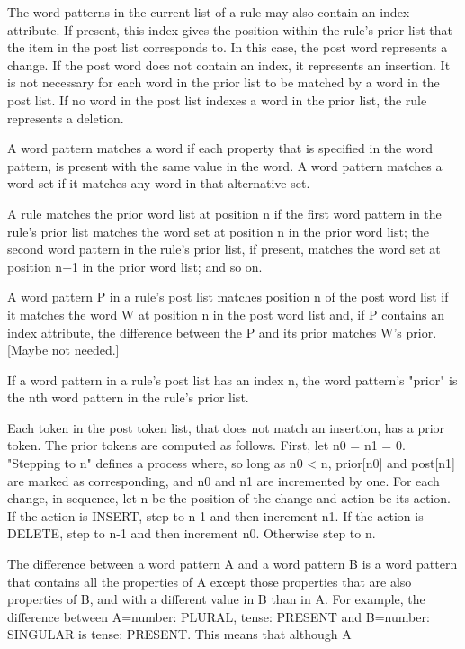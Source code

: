 \documentclass{article}
\begin{document}
The word patterns in the current list of a rule may also contain an index attribute.  If present, this index gives the position within the rule's prior list that the item in the post list corresponds to.  In this case, the post word represents a change.  If the post word does not contain an index, it represents an insertion.  It is not necessary for each word in the prior list to be matched by a word in the post list.  If no word in the post list indexes a word in the prior list, the rule represents a deletion.

A word pattern matches a word if each property that is specified in the word pattern, is present with the same value in the word.  A word pattern matches a word set if it matches any word in that alternative set.

A rule matches the prior word list at position n if the first word pattern in the rule's prior list matches the word set at position n in the prior word list; the second word pattern in the rule's prior list, if present, matches the word set at position n+1 in the prior word list; and so on.

A word pattern P in a rule's post list matches position n of the post word list if it matches the word W at position n in the post word list and, if P contains an index attribute, the difference between the P and its prior matches W's prior.  [Maybe not needed.]

If a word pattern in a rule's post list has an index n, the word pattern's "prior" is the nth word pattern in the rule's prior list.

Each token in the post token list, that does not match an insertion, has a prior token.  The prior tokens are computed as follows.  First, let n0 = n1 = 0.  "Stepping to n" defines a process where, so long as n0 < n, prior[n0] and post[n1] are marked as corresponding, and n0 and n1 are incremented by one.  For each change, in sequence, let n be the position of the change and action be its action.  If the action is INSERT, step to n-1 and then increment n1.  If the action is DELETE, step to n-1 and then increment n0.  Otherwise step to n.

The difference between a word pattern A and a word pattern B is a word pattern that contains all the properties of A except those properties that are also properties of B, and with a different value in B than in A.  For example, the difference between A={number: PLURAL, tense: PRESENT} and B={number: SINGULAR} is {tense: PRESENT}.  This means that although A 
\end{document}
